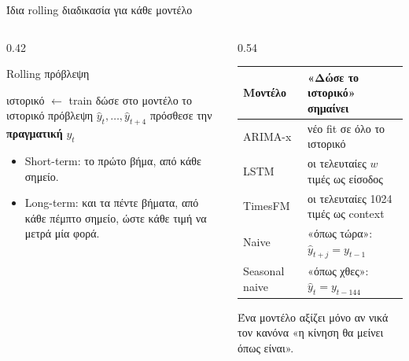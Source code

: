 \documentclass[aspectratio=169,10pt]{beamer}
\newcommand{\muted}[1]{\textcolor{muted}{#1}}
\newcommand{\figcap}[1]{\par\vspace{2pt}{\scriptsize\muted{#1}}}
\begin{document}
\begin{frame}{Ίδια rolling διαδικασία για κάθε μοντέλο}
  \begin{columns}[T, onlytextwidth]
    \begin{column}{0.42\textwidth}
      \begin{block}{Rolling πρόβλεψη}
        \small
        \begin{algorithmic}
          \State ιστορικό $\gets$ train
            \State δώσε στο μοντέλο το ιστορικό
            \State πρόβλεψη $\hat y_{t}, \dots, \hat y_{t+4}$
            \State πρόσθεσε την \textbf{πραγματική} $y_t$
          \EndFor
        \end{algorithmic}
      \end{block}
      \figcap{Siami-Namini et al., ICMLA 2018.}
      \small
      \begin{itemize}
        \item Short-term: το πρώτο βήμα, από κάθε σημείο.
        \item Long-term: και τα πέντε βήματα, από κάθε πέμπτο σημείο, ώστε κάθε τιμή να μετρά μία φορά.
      \end{itemize}
    \end{column}
    \begin{column}{0.54\textwidth}
      \small
      \begin{tabular}{@{}>{\raggedright\arraybackslash}p{}>{\raggedright\arraybackslash}p{}@{}}
        \toprule
        Μοντέλο & «Δώσε το ιστορικό» σημαίνει \\
        \midrule
        ARIMA-x & νέο fit σε όλο το ιστορικό \\
        LSTM & οι τελευταίες $w$ τιμές ως είσοδος \\
        TimesFM & οι τελευταίες 1024 τιμές ως context \\
        \midrule
        \muted{Naive} & \muted{«όπως τώρα»: $\hat y_{t+j} = y_{t-1}$} \\
        \muted{Seasonal naive} & \muted{«όπως χθες»: $\hat y_{t} = y_{t-144}$} \\
        \bottomrule
      \end{tabular}
      \vspace{0.6em}

      Ένα μοντέλο αξίζει μόνο αν νικά τον κανόνα \alert{«η κίνηση θα μείνει όπως είναι»}.
    \end{column}
  \end{columns}
\end{frame}
\end{document}
